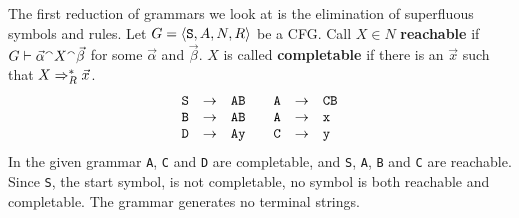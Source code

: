 The first reduction of grammars we look at is the elimination
of superfluous symbols and rules. Let 
$G = \langle \mbox{\tt S}, A, N, R\rangle$
be a CFG. Call $X \in N$ \textbf{reachable}
if $G \vdash \vec{\alpha} {^{\smallfrown}} X {^{\smallfrown}} \vec{\beta}$ for some
$\vec{\alpha}$ and $\vec{\beta}$. $X$ is called \textbf{completable}
if there is an $\vec{x}$ such that $X \Rightarrow^{\ast}_R \vec{x}$.
\begin{equation}
\begin{array}{l@{\quad \pf \quad}l@{\qquad}l@{\quad \pf \quad}l}
\mbox{\tt S} & \mbox{\tt AB} & \mbox{\tt A} & \mbox{\tt CB} \\
\mbox{\tt B} & \mbox{\tt AB} & \mbox{\tt A} & \mbox{\tt x}  \\
\mbox{\tt D} & \mbox{\tt Ay} & \mbox{\tt C} & \mbox{\tt y}
\end{array}
\end{equation}
In the given grammar {\tt A}, {\tt C} and {\tt D}
are completable, and {\tt S}, {\tt A}, {\tt B} and {\tt C}
are reachable. Since {\tt S}, the start symbol, is not completable,
no symbol is both reachable and completable. The grammar generates
no terminal strings.

